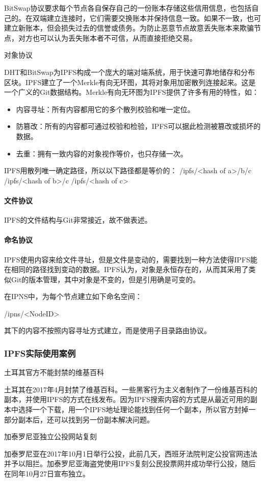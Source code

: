 \documentclass{ctexart}
\begin{document}
BitSwap协议要求每个节点各自保存自己的一份账本存储这些信用信息，也包括自己的。在双端建立连接时，它们需要交换账本并保持信息一致。如果不一致，也可建立新账本，但会损失过去的信誉或债务。为防止恶意节点故意丢失账本来欺骗节点，对方也可以认为丢失账本者不可信，从而直接拒绝交易。

对象协议

DHT和BitSwap为IPFS构成一个庞大的端对端系统，用于快速可靠地储存和分布区块。IPFS建立了一个Merkle有向无环图，其将对象用加密散列连接起来。这是一个广义的Git数据结构。Merkle有向无环图为IPFS提供了许多有用的特性，如：
\begin{itemize}
	\item 内容寻址：所有内容都用它的多个散列校验和唯一定位。
	\item 防篡改：所有的内容都可通过校验和检验，IPFS可以据此检测被篡改或损坏的数据。
	\item 去重：拥有一致内容的对象视作等价，也只存储一次。
\end{itemize}
IPFS用散列唯一确定路径，所以以下路径都是等价的：
/ipfs/<hash of a>/b/c
/ipfs/<hash of b>/c
/ipfs/<hash of c>
\paragraph{文件协议}
IPFS的文件结构与Git非常接近，故不做表述。
\paragraph{命名协议}
IPFS使用内容来给文件寻址，但是文件是变动的，需要找到一种方法使得IPFS能在相同的路径找到变动的数据。IPFS认为，对象是永恒存在的，从而其采用了类似Git的版本管理，其中对象是不变的，但是引用确是可变的。

在IPNS中，为每个节点建立如下命名空间：

/ipns/<NodeID>

其下的内容不按照内容寻址方式建立，而是使用子目录路由协议。
\subsubsection{IPFS实际使用案例}
土耳其官方不能封禁的维基百科

土耳其在2017年4月封禁了维基百科。一些黑客行为主义者制作了一份维基百科的副本，并使用IPFS的方式在线发布。因为IPFS搜索内容的方式是从最近可用的副本中选择一个下载，用一个IPFS地址理论能找到任何一个副本，所以官方封掉一部分副本后，还可以找到另一份副本解决问题。

加泰罗尼亚独立公投网站复刻

加泰罗尼亚在2017年10月1日举行公投，此前几天，西班牙法院判定公投官网违法并予以阻拦。加泰罗尼亚海盗党使用IPFS复刻公民投票网并成功举行公投，随后在同年10月27日宣布独立。
\end{document}
